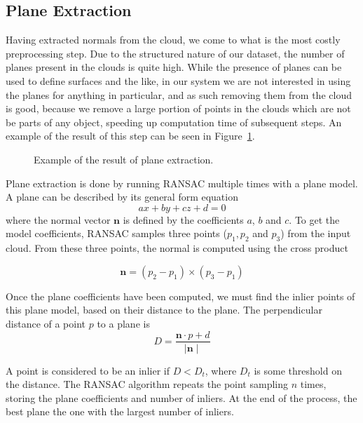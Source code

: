 \documentclass[11pt,a4paper]{kth-mag}
\begin{document}
\subsection{Plane Extraction}
Having extracted normals from the cloud, we come to what is the most costly
preprocessing step. Due to the structured nature of our dataset, the number of
planes present in the clouds is quite high. While the presence of planes can be
used to define surfaces and the like, in our system we are not interested in
using the planes for anything in particular, and as such removing them from the
cloud is good, because we remove a large portion of points in the clouds which
are not be parts of any object, speeding up computation time of subsequent
steps. An example of the result of this step can be seen in
Figure~\ref{fig:plane_extr}.

\begin{figure}
  \centering
  
  \caption{Example of the result of plane extraction.}
  \label{fig:plane_extr}
\end{figure}

Plane extraction is done by running RANSAC multiple times with a plane model. A
plane can be described by its general form equation
\begin{equation}
  \label{eq:1}
  ax+by+cz+d=0
\end{equation}
where the normal vector $\mathbf{n}$ is defined by the coefficients $a$, $b$ and
$c$. To get the model coefficients, RANSAC samples three points ($p_1,p_2$ and
$p_3$) from the input cloud. From these three points, the normal is computed
using the cross product \cite{planeeq}

\begin{equation}
  \label{eq:2}
  \mathbf{n}=(p_2-p_1)\times(p_3-p_1)
\end{equation}

Once the plane coefficients have been computed, we must find the inlier points of this
plane model, based on their distance to the plane. The perpendicular distance of
a point $p$ to a plane is
\begin{equation}
  \label{eq:3}
  D=\frac{\mathbf{n}\cdot p + d}{\mid \mathbf{n} \mid}
\end{equation}

A point is considered to be an inlier if $D<D_t$, where $D_t$ is some threshold
on the distance. The RANSAC algorithm repeats the point sampling $n$ times,
storing the plane coefficients and number of inliers. At the end of the process,
the best plane the one with the largest number of inliers.
\end{document}
